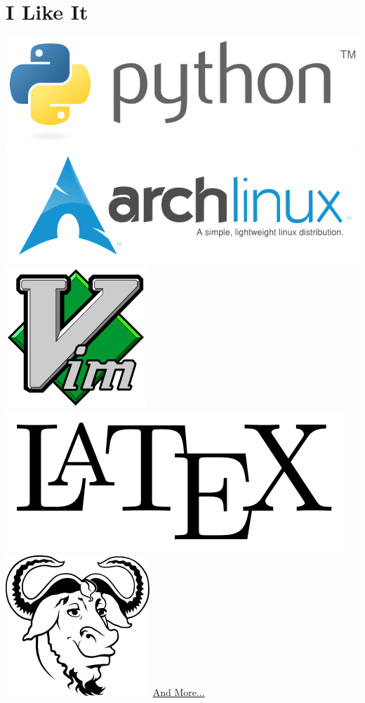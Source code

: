 \documentclass[]{friggeri-cv}
\begin{document}
\begin{aside}
~
~
~
  \section{I Like It}
    \includegraphics[scale=0.18]{img/python.png}
    \includegraphics[scale=0.18]{img/arch.png}
    \includegraphics[scale=0.06]{img/vim.png}
    \includegraphics[scale=0.06]{img/latex.png}
    \includegraphics[scale=0.08]{img/gnu.png}
    \href{http://www.herve-beraud.ovh/skills/}{And More...}
    ~

\end{aside}
\end{document}
